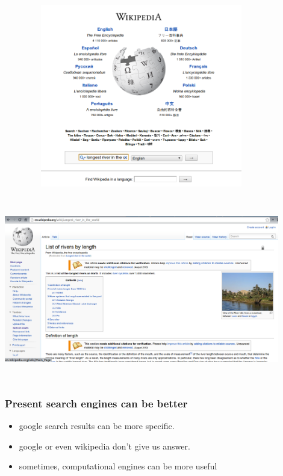 \documentclass{beamer}
\begin{document}
\begin{frame}
 \includegraphics[width=12cm,height=8cm]{four.png}
\end{frame}

\begin{frame}
 \includegraphics[width=12cm,height=8cm]{three.png}
\end{frame}

\begin{frame}
  \frametitle{Present search engines can be better}
 \begin{itemize}
  \item google search results can be more specific.
    \item google or even wikipedia don't give us answer.
    \pause
  \item sometimes, computational engines can be more useful

 \end{itemize}
\end{frame}
\end{document}

